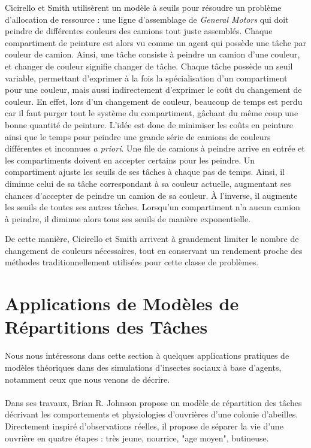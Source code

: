         Cicirello et Smith \cite{cicirello_wasp-like_2004} utilisèrent un modèle à seuils pour résoudre un problème d'allocation de ressource : une ligne d'assemblage de \textit{General Motors} qui doit peindre de différentes couleurs des camions tout juste assemblés. Chaque compartiment de peinture est alors vu comme un agent qui possède une tâche par couleur de camion. Ainsi, une tâche consiste à peindre un camion d'une couleur, et changer de couleur signifie changer de tâche. Chaque tâche possède un seuil variable, permettant d'exprimer à la fois la spécialisation d'un compartiment pour une couleur, mais aussi indirectement d'exprimer le coût du changement de couleur. En effet, lors d'un changement de couleur, beaucoup de temps est perdu car il faut purger tout le système du compartiment, gâchant du même coup une bonne quantité de peinture. L'idée est donc de minimiser les coûts en peinture ainsi que le temps pour peindre une grande série de camions de couleurs différentes et inconnues \textit{a priori}. Une file de camions à peindre arrive en entrée et les compartiments doivent en accepter certains pour les peindre. Un compartiment ajuste les seuils de ses tâches à chaque pas de temps. Ainsi, il diminue celui de sa tâche correspondant à sa couleur actuelle, augmentant ses chances d'accepter de peindre un camion de sa couleur. À l'inverse, il augmente les seuils de toutes ses autres tâches. Lorsqu'un compartiment n'a aucun camion à peindre, il diminue alors tous ses seuils de manière exponentielle.
        
        De cette manière, Cicirello et Smith arrivent à grandement limiter le nombre de changement de couleurs nécessaires, tout en conservant un rendement proche des méthodes traditionnellement utilisées pour cette classe de problèmes.
        
        
        \section{Applications de Modèles de Répartitions des Tâches}
        \label{sectionAppli}
        Nous nous intéressons dans cette section à quelques applications pratiques de modèles théoriques dans des simulations d'insectes sociaux à base d'agents, notamment ceux que nous venons de décrire. 
        
        \paragraph{}
        Dans ses travaux, Brian R. Johnson \cite{johnson_division_2010} propose un modèle de répartition des tâches décrivant les comportements et physiologies d'ouvrières d'une colonie d'abeilles. Directement inspiré d'observations réelles, il propose de séparer la vie d'une ouvrière en quatre étapes : très jeune, nourrice, "age moyen", butineuse. 
        

